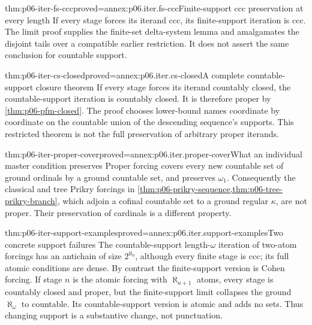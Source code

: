 \begin{hbtheorem}{thm:p06-iter-fs-ccc}{proved=annex:p06.iter.fs-ccc}{Finite-support ccc preservation at every length}
If every stage forces its iterand ccc, its finite-support iteration is
ccc. The limit proof supplies the finite-set delta-system lemma and
amalgamates the disjoint tails over a compatible earlier restriction.
It does not assert the same conclusion for countable support.
\end{hbtheorem}

\begin{hbtheorem}{thm:p06-iter-cs-closed}{proved=annex:p06.iter.cs-closed}{A complete countable-support closure theorem}
If every stage forces its iterand countably closed, the countable-support
iteration is countably closed. It is therefore proper by
\cref{thm:p06-pfm-closed}. The proof chooses lower-bound names
coordinate by coordinate on the countable union of the descending
sequence's supports. This restricted theorem is not the full preservation
of arbitrary proper iterands.
\end{hbtheorem}

\begin{hblemma}{thm:p06-iter-proper-cover}{proved=annex:p06.iter.proper-cover}{What an individual master condition preserves}
Proper forcing covers every new countable set of ground ordinals by a
ground countable set, and preserves \(\omega_1\). Consequently the
classical and tree Prikry forcings in
\cref{thm:p06-prikry-sequence,thm:p06-tree-prikry-branch}, which
adjoin a cofinal countable set to a ground regular \(\kappa\), are
not proper. Their preservation of cardinals is a different property.
\end{hblemma}

\begin{hbtheorem}{thm:p06-iter-support-examples}{proved=annex:p06.iter.support-examples}{Two concrete support failures}
The countable-support length-\(\omega\) iteration of two-atom forcings
has an antichain of size \(2^{\aleph_0}\), although every finite stage
is ccc; its full atomic conditions are dense. By contrast the finite-support
version is Cohen forcing. If stage \(n\) is the atomic forcing with
\(\aleph_{n+1}\) atoms, every stage is countably closed and proper,
but the finite-support limit collapses the ground \(\aleph_\omega\)
to countable. Its countable-support version is atomic and adds no sets.
Thus changing support is a substantive change, not punctuation.
\end{hbtheorem}

